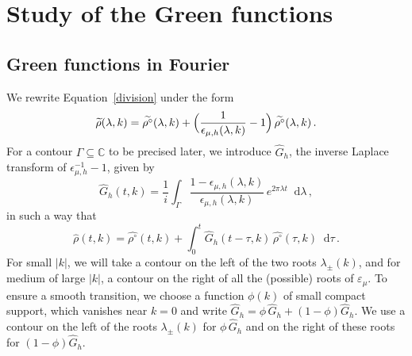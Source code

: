 \documentclass[a4paper,12pt]{amsart} %
\theoremstyle{plain}
\theoremstyle{definition}
\newcommand		{\CC}		{\mathbb C}			%
\newcommand		{\lt}			{\left}				%
\newcommand		{\rt}			{\right}			%
\renewcommand	{\(}			{\lt(}
\renewcommand	{\)}			{\rt)}
\newcommand		{\n}[1]			{\lt\lvert{#1}\rt\rvert}	%
\renewcommand		{\d}		{\mathop{}\!\mathrm{d}}		%
\newcommand		{\eps}			{\varepsilon}
\newcommand	{\h}			{h}
\newcommand		{\hatG}			{\widehat{G}}
\begin{document}


\section{Study of the Green functions}



	

\subsection{Green functions in Fourier}


	We rewrite Equation~\eqref{division} under the form 
	\begin{equation*}
		\widetilde{\rho}(\lambda,k) = \widetilde{\rho^\circ}(\lambda,k) + \Bigl( \frac{1}{\epsilon_{\mu,\h}(\lambda,k)} - 1 \Bigr) \,\widetilde{\rho^\circ}(\lambda,k) \, .
	\end{equation*}
	For a contour $\Gamma\subseteq \CC$ to be precised later, we introduce $\widehat{G}_\h$, the inverse Laplace transform of $\epsilon_{\mu,\h}^{-1}-1$, given by
	\begin{equation}\label{eq:def_Gk}
		\widehat{G}_\h(t,k) = \frac{1}{i} \int_\Gamma \frac{1-\epsilon_{\mu,\h}(\lambda,k)}{\epsilon_{\mu,\h}(\lambda,k)} \, e^{2\pi\lambda t} \d\lambda \, ,
	\end{equation}
	in such a way that
	\begin{equation}\label{eq:inversion2}
		\widehat{\rho}(t,k) = \widehat{\rho^\circ}(t,k) + \int_0^t \widehat{G}_\h(t - \tau,k) \,\widehat{\rho^\circ}(\tau,k) \d\tau\, .
	\end{equation}
	For small $\n{k}$, we will take a contour on the left of the two roots $\lambda_\pm(k)$, and for medium of large $\n{k}$, a contour on the right of all the (possible) roots of $\eps_\mu$. To ensure a smooth transition, we choose a function $\phi(k)$ of small compact support, which vanishes near $k = 0$ and write $\hatG_\h = \phi \,\hatG_\h + \lt(1 - \phi\rt) \hatG_\h$. We use a contour on the left of the roots $\lambda_\pm(k)$ for $\phi \,\hatG_\h$ and on the right of these roots for $\lt(1 - \phi\rt) \hatG_\h$.
 
\end{document}
